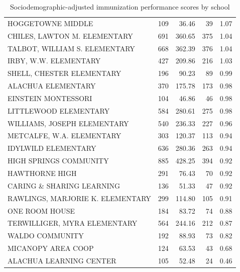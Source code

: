 \begin{table}[H]
\begin{table}[ht]
{\begin{tabular}{lrrrr}
  HOGGETOWNE MIDDLE  & 109 & 36.46 &  39 & 1.07 \\ 
  CHILES, LAWTON M. ELEMENTARY & 691 & 360.65 & 375 & 1.04 \\ 
  TALBOT, WILLIAM S. ELEMENTARY & 668 & 362.39 & 376 & 1.04 \\ 
  IRBY, W.W. ELEMENTARY & 427 & 209.86 & 216 & 1.03 \\ 
  SHELL, CHESTER ELEMENTARY & 196 & 90.23 &  89 & 0.99 \\ 
  ALACHUA ELEMENTARY & 370 & 175.78 & 173 & 0.98 \\ 
  EINSTEIN MONTESSORI  & 104 & 46.86 &  46 & 0.98 \\ 
  LITTLEWOOD ELEMENTARY & 584 & 280.61 & 275 & 0.98 \\ 
  WILLIAMS, JOSEPH ELEMENTARY & 540 & 236.33 & 227 & 0.96 \\ 
  METCALFE, W.A. ELEMENTARY & 303 & 120.37 & 113 & 0.94 \\ 
  IDYLWILD ELEMENTARY & 636 & 280.36 & 263 & 0.94 \\ 
  HIGH SPRINGS COMMUNITY  & 885 & 428.25 & 394 & 0.92 \\ 
  HAWTHORNE HIGH  & 291 & 76.43 &  70 & 0.92 \\ 
  CARING \& SHARING LEARNING & 136 & 51.33 &  47 & 0.92 \\ 
  RAWLINGS, MARJORIE K. ELEMENTARY & 299 & 114.80 & 105 & 0.91 \\ 
  ONE ROOM  HOUSE & 184 & 83.72 &  74 & 0.88 \\ 
  TERWILLIGER, MYRA ELEMENTARY & 564 & 244.16 & 212 & 0.87 \\ 
  WALDO COMMUNITY  & 192 & 88.93 &  73 & 0.82 \\ 
  MICANOPY AREA COOP  & 124 & 63.53 &  43 & 0.68 \\ 
  ALACHUA LEARNING CENTER & 105 & 52.48 &  24 & 0.46 \\ 
   \hline
\end{tabular}
}
\caption{Sociodemographic-adjusted immunization performance scores by school} 
\end{table}\end{table}



